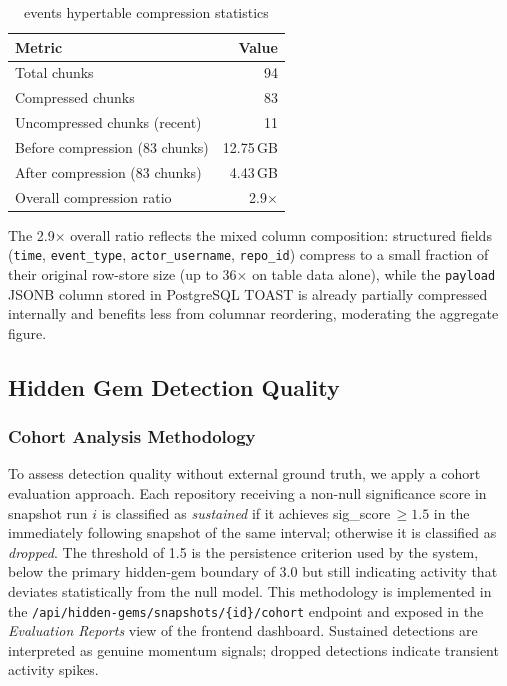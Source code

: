 \documentclass[sigconf]{acmart}
\begin{document}
\begin{table}[ht]
  \caption{events hypertable compression statistics}
  \label{tab:compression}
  \centering
  \begin{tabular}{l r}
    \toprule
    \textbf{Metric} & \textbf{Value} \\
    \midrule
    Total chunks                    & 94 \\
    Compressed chunks               & 83 \\
    Uncompressed chunks (recent)    & 11 \\
    Before compression (83 chunks)  & 12.75\,GB \\
    After compression  (83 chunks)  &  4.43\,GB \\
    Overall compression ratio       & 2.9$\times$ \\
    \bottomrule
  \end{tabular}
\end{table}

The 2.9$\times$ overall ratio reflects the mixed column composition:
structured fields (\texttt{time}, \texttt{event\_type},
\texttt{actor\_username}, \texttt{repo\_id}) compress to a small fraction
of their original row-store size (up to 36$\times$ on table data alone),
while the \texttt{payload} JSONB column stored in PostgreSQL TOAST is
already partially compressed internally and benefits less from columnar
reordering, moderating the aggregate figure.

\subsection{Hidden Gem Detection Quality}
\label{sec:eval-hg}

\subsubsection{Cohort Analysis Methodology}

To assess detection quality without external ground truth, we apply a cohort
evaluation approach. Each repository receiving a non-null significance score in
snapshot run $i$ is classified as \emph{sustained} if it achieves
sig\_score\,$\geq 1.5$ in the immediately following snapshot of the same interval;
otherwise it is classified as \emph{dropped}. The threshold of 1.5 is the
persistence criterion used by the system, below the primary hidden-gem boundary
of 3.0 but still indicating activity that deviates statistically from the null
model. This methodology is implemented in the
\texttt{/api/hidden-gems/snapshots/\{id\}/cohort} endpoint and exposed in the
\textit{Evaluation Reports} view of the frontend dashboard. Sustained
detections are interpreted as genuine momentum signals; dropped detections
indicate transient activity spikes.
\end{document}

